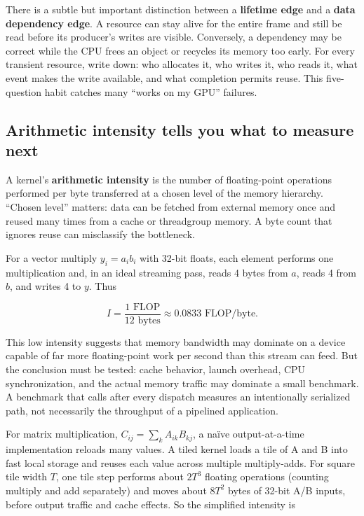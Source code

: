 There is a subtle but important distinction between a \textbf{lifetime edge} and a \textbf{data dependency edge}. A resource can stay alive for the entire frame and still be read before its producer's writes are visible. Conversely, a dependency may be correct while the CPU frees an object or recycles its memory too early. For every transient resource, write down: who allocates it, who writes it, who reads it, what event makes the write available, and what completion permits reuse. This five-question habit catches many ``works on my GPU'' failures.

\subsection{Arithmetic intensity tells you what to measure next}\label{05-engine-i-ch019-arithmetic-intensity-tells-you-what-to-measure-next}

\hypertarget{05-engine-i-ch019-arithmetic-intensity-tells-you-what-to-measure-next}{}

A kernel's \textbf{arithmetic intensity} is the number of floating-point operations performed per byte transferred at a chosen level of the memory hierarchy. ``Chosen level'' matters: data can be fetched from external memory once and reused many times from a cache or threadgroup memory. A byte count that ignores reuse can misclassify the bottleneck.

For a vector multiply \(y_i=a_i b_i\) with 32-bit floats, each element performs one multiplication and, in an ideal streaming pass, reads 4 bytes from \(a\), reads 4 from \(b\), and writes 4 to \(y\). Thus

\[
I=\frac{1\text{ FLOP}}{12\text{ bytes}}\approx0.0833\text{ FLOP/byte}.
\]

This low intensity suggests that memory bandwidth may dominate on a device capable of far more floating-point work per second than this stream can feed. But the conclusion must be tested: cache behavior, launch overhead, CPU synchronization, and the actual memory traffic may dominate a small benchmark. A benchmark that calls  after every dispatch measures an intentionally serialized path, not necessarily the throughput of a pipelined application.

For matrix multiplication, \(C_{ij}=\sum_k A_{ik}B_{kj}\), a naïve output-at-a-time implementation reloads many values. A tiled kernel loads a tile of A and B into fast local storage and reuses each value across multiple multiply-adds. For square tile width \(T\), one tile step performs about \(2T^3\) floating operations (counting multiply and add separately) and moves about \(8T^2\) bytes of 32-bit A/B inputs, before output traffic and cache effects. So the simplified intensity is

